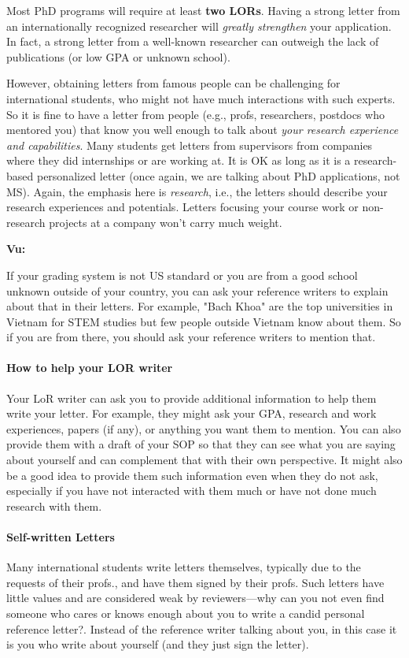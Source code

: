 \documentclass[oneside,11pt]{book}
\newenvironment{commentbox}[1][]{
  \small
  \begin{mybox}
    {\small \textbf{#1}}
  }{
  \end{mybox}
}
\begin{document}
Most PhD programs will require at least \textbf{two LORs}. Having a strong letter from an internationally recognized researcher will \emph{greatly strengthen} your application. In fact, a strong letter from a well-known researcher can outweigh the lack of publications (or low GPA or unknown school).


However, obtaining letters from famous people 
can be challenging for international students, who might not have much interactions with such experts. So it is fine to have a letter from people (e.g., profs, researchers, postdocs who mentored you) that know you well enough to talk about \emph{your research experience and capabilities}. Many students get letters from supervisors from companies where they did internships or are working at. It is OK as long as it is a research-based personalized letter (once again, we are talking about PhD applications, not MS). Again, the emphasis here is \emph{research}, i.e., the letters should describe your research experiences and potentials. Letters focusing your course work or non-research projects at a company won't carry much weight.

\begin{commentbox}[Vu:]
  If your grading system is not US standard or you are from a good school unknown outside of your country, you can ask your reference writers to explain about that in their letters.  For example, "Bach Khoa" are the top universities in Vietnam for STEM studies but few people outside Vietnam know about them.  So if you are from there, you should ask your reference writers to mention that.
\end{commentbox}

\paragraph{How to help your LOR writer} Your LoR writer can ask you to provide additional information to help them write your letter.  For example, they might ask your GPA, research and work experiences, papers (if any), or anything you want them to mention. You can also provide them with a draft of your SOP so that they can see what you are saying about yourself and can complement that with their own perspective.  It might also be a good idea to provide them such information even when they do not ask, especially if you have not interacted with them much or have not done much research with them.


\paragraph{Self-written Letters} Many international students write letters themselves, typically due to the requests of their profs., and have them signed by their profs. Such letters have little values and are considered weak by reviewers---why can you not even find someone who cares or knows enough about you to write a candid personal reference letter?.  Instead of the reference writer talking about you, in this case it is you who write about yourself (and they just sign the letter).
\end{document}
